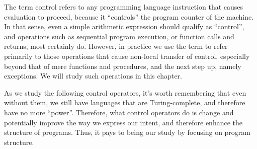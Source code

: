 \secdown

The term control refers to any programming language instruction that causes
evaluation to proceed, because it “controls” the program counter of the machine.
In that sense, even a simple arithmetic expression should qualify as “control”,
and operations such as sequential program execution, or function calls and
returns, most certainly do. However, in practice we use the term to refer
primarily to those operations that cause non-local transfer of control,
especially beyond that of mere functions and procedures, and the next step up,
namely exceptions. We will study such operations in this chapter.

As we study the following control operators, it’s worth remembering that even
without them, we still have languages that are Turing-complete, and therefore
have no more “power”. Therefore, what control operators do is change and
potentially improve the way we express our intent, and therefore enhance the
structure of programs. Thus, it pays to being our study by focusing on program
structure.







\secup

